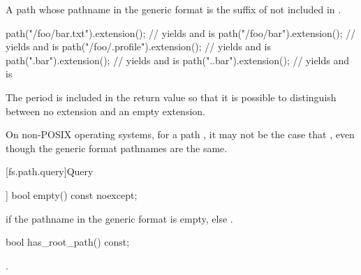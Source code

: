 \begin{itemdescr}
\pnum
\returns A path whose pathname in the generic format is
the suffix of  not included in .

\pnum
\begin{example}
\begin{codeblock}
path("/foo/bar.txt").extension();  // yields  and  is 
path("/foo/bar").extension();      // yields  and  is 
path("/foo/.profile").extension(); // yields  and  is 
path(".bar").extension();          // yields  and  is 
path("..bar").extension();         // yields  and  is 
\end{codeblock}
\end{example}

\pnum
\begin{note} The period is included in the return value so that it is
  possible to distinguish between no extension and an empty extension.
\end{note}

\pnum
\begin{note}
On non-POSIX operating systems, for a path ,
it may not be the case that ,
even though the generic format pathnames are the same.
\end{note}
\end{itemdescr}

[fs.path.query]{Query}

%
\begin{itemdecl}
[[nodiscard]] bool empty() const noexcept;
\end{itemdecl}

\begin{itemdescr}
\pnum
\returns {} if the pathname in the generic format is empty, else .
\end{itemdescr}

%
\begin{itemdecl}
bool has_root_path() const;
\end{itemdecl}

\begin{itemdescr}
\pnum
\returns {}.
\end{itemdescr}

